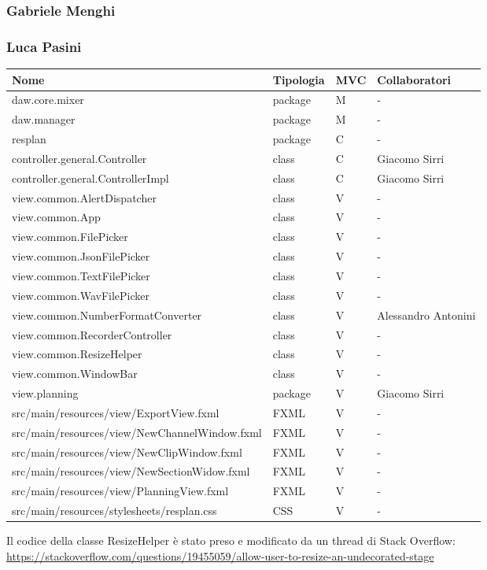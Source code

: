 \documentclass[a4paper,12pt]{report}
\begin{document}
\subsubsection{Gabriele Menghi}

\endsubsubsection
\subsubsection{Luca Pasini}
\begin{center}
\begin{longtable}{| m{23em} | m{1.5cm}| m{1cm} | m{2.5cm} |} 
 \hline
  Nome & Tipologia & MVC & Collaboratori \\ [0.5ex] 
\hline
daw.core.mixer & package & M & - \\
\hline
daw.manager & package & M & - \\
\hline
resplan & package & C & - \\
\hline
controller.general.Controller & class & C & Giacomo Sirri \\
\hline
controller.general.ControllerImpl & class & C & Giacomo Sirri \\
\hline
view.common.AlertDispatcher & class & V & - \\
\hline
view.common.App & class & V & - \\
\hline
view.common.FilePicker & class & V & - \\
\hline
view.common.JsonFilePicker & class & V & - \\
\hline
view.common.TextFilePicker & class & V & - \\
\hline
view.common.WavFilePicker & class & V & - \\
\hline 
view.common.NumberFormatConverter & class & V & Alessandro Antonini \\
\hline
view.common.RecorderController & class & V & - \\
\hline
view.common.ResizeHelper & class & V & - \\
\hline
view.common.WindowBar & class & V & - \\
\hline
view.planning & package & V & Giacomo Sirri \\
\hline
src/main/resources/view/ExportView.fxml & FXML & V & - \\
\hline
src/main/resources/view/NewChannelWindow.fxml & FXML & V & - \\
\hline
src/main/resources/view/NewClipWindow.fxml & FXML & V & - \\
\hline
src/main/resources/view/NewSectionWidow.fxml & FXML & V & - \\
\hline
src/main/resources/view/PlanningView.fxml & FXML & V & - \\
\hline
src/main/resources/stylesheets/resplan.css & CSS & V & - \\
\hline
\end{longtable}
\end{center}
Il codice della classe ResizeHelper è stato preso e modificato da un thread di Stack Overflow: 
\hyperlink{https://stackoverflow.com/questions/19455059/allow-user-to-resize-an-undecorated-stage}{https://stackoverflow.com/questions/19455059/allow-user-to-resize-an-undecorated-stage}
\endsubsubsection
\endsubsection
\end{document}
